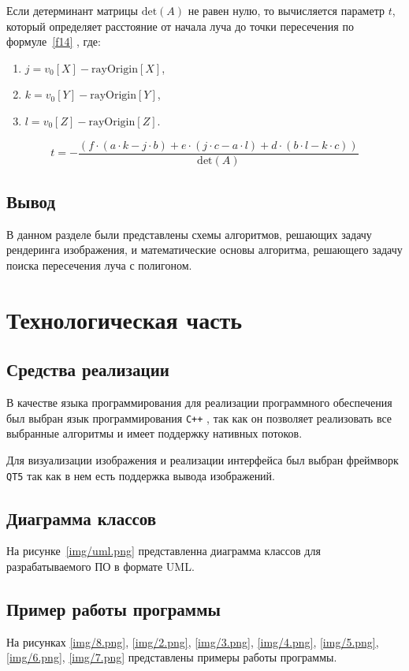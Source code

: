 Если детерминант матрицы \(\text{det}(A)\) не равен нулю, то вычисляется параметр \(t\), который определяет расстояние от начала луча до точки пересечения по формуле~\ref{f14} \cite{sherley}, где:
\begin{enumerate}
    \item \(j = v_0[X] - \text{rayOrigin}[X]\),
    \item \(k = v_0[Y] - \text{rayOrigin}[Y]\),
    \item \(l = v_0[Z] - \text{rayOrigin}[Z]\).
\end{enumerate}

\begin{equation}
t = - \frac{(f \cdot (a \cdot k - j \cdot b) + e \cdot (j \cdot c - a \cdot l) + d \cdot (b \cdot l - k \cdot c))}{\text{det}(A)}
\label{f14}
\end{equation}

\section{Вывод}
В данном разделе были представлены схемы алгоритмов, решающих задачу рендеринга изображения, и математические основы алгоритма, решающего задачу поиска пересечения луча с полигоном.

\chapter{Технологическая часть}
\section{Средства реализации}
В качестве языка программирования для реализации программного
обеспечения был выбран язык программирования \texttt{C++} \cite{cpp}, так как он позволяет реализовать все выбранные алгоритмы и имеет поддержку нативных потоков.

Для визуализации изображения и реализации интерфейса был выбран фреймворк \texttt{QT5} \cite{qt5} так как в нем есть поддержка вывода изображений.

\section{Диаграмма классов}
На рисунке~\ref{img/uml.png} представленна диаграмма классов для разрабатываемого ПО в формате UML.

\section{Пример работы программы}
На рисунках \ref{img/8.png}, \ref{img/2.png}, \ref{img/3.png}, \ref{img/4.png}, \ref{img/5.png}, \ref{img/6.png}, \ref{img/7.png} представлены примеры работы программы.

